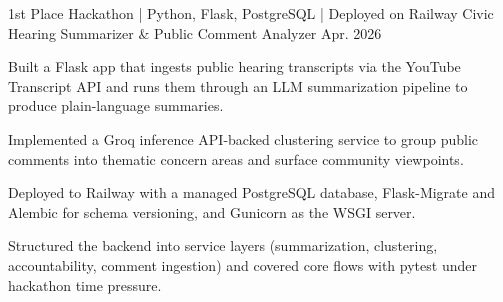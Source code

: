 \begin{cventries}

  \cventry
    {1st Place Hackathon | Python, Flask, PostgreSQL | Deployed on Railway} %
    {Civic Hearing Summarizer \& Public Comment Analyzer} %
    {} %
    {Apr. 2026} %
    {
      \begin{cvitems}
        \item {Built a Flask app that ingests public hearing transcripts via the YouTube Transcript API and runs them through an LLM summarization pipeline to produce plain-language summaries.}
        \item {Implemented a Groq inference API-backed clustering service to group public comments into thematic concern areas and surface community viewpoints.}
        \item {Deployed to Railway with a managed PostgreSQL database, Flask-Migrate and Alembic for schema versioning, and Gunicorn as the WSGI server.}
        \item {Structured the backend into service layers (summarization, clustering, accountability, comment ingestion) and covered core flows with pytest under hackathon time pressure.}
      \end{cvitems}
    }

\end{cventries}
